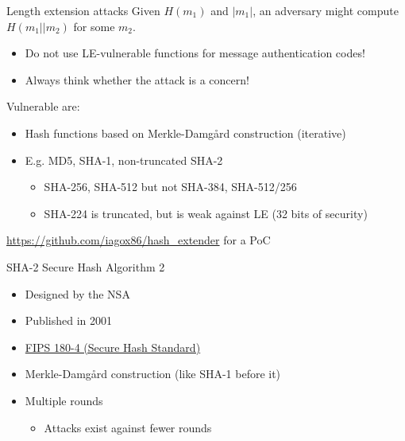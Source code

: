 \begin{frame}{Length extension attacks}
  Given $H(m_1)$ and $\lvert m_1\rvert$, an adversary might compute $H(m_1 || m_2)$ for some $m_2$.
  \begin{itemize}[<+(1)->]
    \item Do not use LE-vulnerable functions for message authentication codes!
    \item Always think whether the attack is a concern!
  \end{itemize}

  \vspace*{1em}

  \pause
  Vulnerable are:
  \begin{itemize}[<+(1)->]
    \item Hash functions based on Merkle-Damgård construction (iterative)
    \item E.g. MD5, SHA-1, non-truncated SHA-2
    \begin{itemize}
      \item SHA-256, SHA-512 but not SHA-384, SHA-512/256
      \item SHA-224 is truncated, but is weak against LE (32 bits of security)
    \end{itemize}
  \end{itemize}

  \pause
  {\scriptsize\url{https://github.com/iagox86/hash_extender} for a PoC}
\end{frame}

\begin{frame}{SHA-2}
  Secure Hash Algorithm 2
  \begin{itemize}[<+(1)->]
    \item Designed by the NSA
    \item Published in 2001
    \item \href{https://csrc.nist.gov/pubs/fips/180-4/upd1/final}{FIPS 180-4 (Secure Hash Standard)}
    \item Merkle-Damgård construction (like SHA-1 before it)
    \item Multiple rounds
    \begin{itemize}
      \item Attacks exist against fewer rounds
    \end{itemize}
  \end{itemize}
\end{frame}


